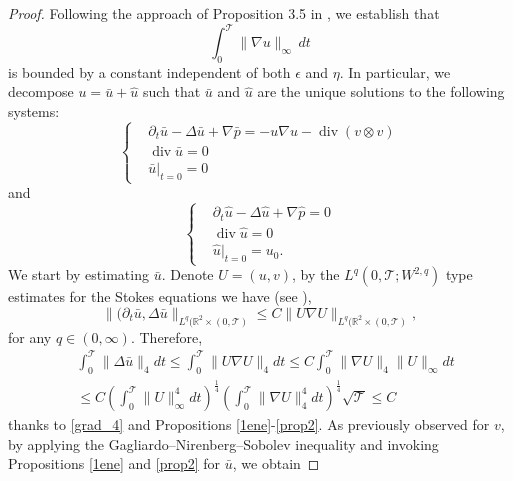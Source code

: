 \documentclass[11pt, a4paper, article,reqno,]{amsart}
\theoremstyle{remark}
\DeclareMathOperator{\dive}{div}
\numberwithin{equation}{section}
\begin{document}
\begin{proof}
Following the approach of Proposition 3.5 in \cite{LT}, we establish that 
\[
\int_0^\mathcal{T} \|\nabla u\|_{\infty} \, dt
\]
is bounded by a constant independent of both $\epsilon$ and $\eta$. In particular, we decompose $u= \bar{u}+ \hat{u}$ such that $\bar{u}$ and $\hat{u}$ are the unique solutions to the following systems:
\begin{equation}
    \left\{ \begin{aligned}\label{baru}
        & \partial_t \bar{u} - \Delta \bar{u} + \nabla \bar{p}= - u \nabla u - \dive (v \otimes v) \\
        & \dive \bar{u} = 0\\
        & \bar{u}|_{t=0} = 0
    \end{aligned} \right.
\end{equation}
and 
\begin{equation}\label{hatu}
    \left\{ \begin{aligned}
        & \partial_t \hat{u} - \Delta \hat{u} + \nabla \hat{p}= 0\\
        & \dive \hat{u}= 0\\
        &\hat{u}|_{t=0} = u_0.
    \end{aligned} \right.
\end{equation}
We start by  estimating  $\bar{u}$. Denote $U=(u,v)$, by the $L^q(0,\mathcal{T}; W^{2,q})$ type estimates for the Stokes equations we have (see \cite{LT}),
\begin{equation*}
    \|(\partial_t \bar{u}, \Delta \bar{u}\|_{L^q( \mathbb{R}^2 \times (0,\mathcal{T})} \leq C \|U \nabla U\|_{L^q( \mathbb{R}^2 \times (0,\mathcal{T})}, 
\end{equation*}
for any $q \in (0, \infty)$. Therefore,
\begin{equation*}
\begin{aligned}
    &  \int_0^\mathcal{T} \|\Delta \bar{u}\|_4 dt \leq \int_0^\mathcal{T} \|U \nabla U\|_4 dt \leq C \int_0^\mathcal{T} \|\nabla U\|_4 \|U\|_{\infty} dt\\
    & \leq C \left( \int_0^\mathcal{T} \|U\|_\infty^4 dt \right)^{\frac{1}{4}} \left( \int_0^\mathcal{T} \|\nabla U\|_4^4  dt\right)^{\frac{1}{4}} \sqrt{\mathcal{T}} \leq C
\end{aligned}
\end{equation*}
thanks to \eqref{grad_4} and Propositions \ref{1ene}-\ref{prop2}. As previously observed for $v$, by applying the Gagliardo–Nirenberg–Sobolev inequality and invoking Propositions \ref{1ene} and \ref{prop2} for $\bar u$, we obtain


\end{proof}
\end{document}
